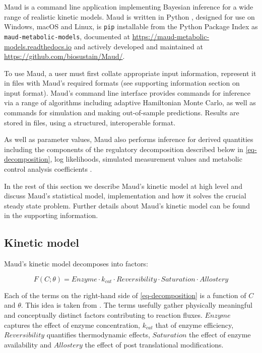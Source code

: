 \documentclass[journal=asbcd6,manuscript=article,layout=traditional]{achemso}
\begin{document}
Maud is a command line application implementing Bayesian inference for a
wide range of realistic kinetic models. Maud is written in Python
\citep{vanrossumPythonReferenceManual2009}, designed for use on Windows,
macOS and Linux, is \texttt{pip} installable from the Python Package
Index as \texttt{maud-metabolic-models}, documented at
\url{https://maud-metabolic-models.readthedocs.io} and actively
developed and maintained at \url{https://github.com/biosustain/Maud/}.

To use Maud, a user must first collate appropriate input information,
represent it in files with Maud's required formats (see supporting
information section on input format). Maud's command line interface
provides commands for inference via a range of algorithms including
adaptive Hamiltonian Monte Carlo, as well as commands for simulation and
making out-of-sample predictions. Results are stored in files, using a
structured, interoperable format.

As well as parameter values, Maud also performs inference for derived
quantities including the components of the regulatory decomposition
described below in \eqref{eq-decomposition}, log likelihoods, simulated
measurement values and metabolic control analysis coefficients
\citep{kacser_control_1973}.

In the rest of this section we describe Maud's kinetic model at high
level and discuss Maud's statistical model, implementation and how it
solves the crucial steady state problem. Further details about Maud's
kinetic model can be found in the supporting information.

\hypertarget{kinetic-model}{%
\subsection{Kinetic model}\label{kinetic-model}}

Maud's kinetic model decomposes into factors:

\begin{equation}
F(C;\theta) = Enzyme\cdot k_{cat}\cdot Reversibility \cdot Saturation \cdot Allostery \label{eq-decomposition}
\end{equation}

Each of the terms on the right-hand side of \eqref{eq-decomposition} is
a function of \(C\) and \(\theta\). This idea is taken from
\citet{noor_note_2013}. The terms usefully gather physically meaningful
and conceptually distinct factors contributing to reaction fluxes.
\(Enzyme\) captures the effect of enzyme concentration, \(k_{cat}\) that
of enzyme efficiency, \(Reversibility\) quantifies thermodynamic
effects, \(Saturation\) the effect of enzyme availability and
\(Allostery\) the effect of post translational modifications.
\end{document}
